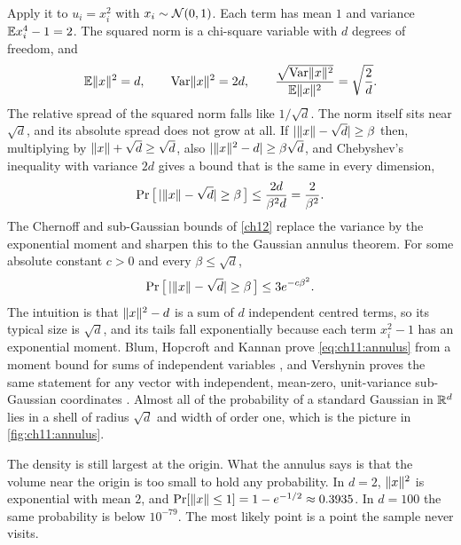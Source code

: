 Apply it to $u_i=x_i^2$ with $x_i\sim\mathcal{N}(0,1)$. Each term has mean $1$ and variance $\mathbb{E} x_i^4-1=2$. The squared norm is a chi-square variable with $d$ degrees of freedom, and
\begin{equation}\label{eq:ch11:chisq}
\mathbb{E}\lVert x\rVert^2=d,\qquad \operatorname{Var}\lVert x\rVert^2=2d,\qquad
\frac{\sqrt{\operatorname{Var}\lVert x\rVert^2}}{\mathbb{E}\lVert x\rVert^2}=\sqrt{\frac 2d}.
\end{equation}
The relative spread of the squared norm falls like $1/\sqrt d$. The norm itself sits near $\sqrt d$, and its absolute spread does not grow at all. If $\lvert \lVert x\rVert-\sqrt d\rvert\ge\beta$ then, multiplying by $\lVert x\rVert+\sqrt d\ge\sqrt d$, also $\lvert \lVert x\rVert^2-d\rvert\ge\beta\sqrt d$, and Chebyshev's inequality with variance $2d$ gives a bound that is the same in every dimension,
\begin{equation}\label{eq:ch11:annulus-cheb}
\Pr\big[\,\lvert \lVert x\rVert-\sqrt d\rvert\ge\beta\,\big]\le\frac{2d}{\beta^2 d}=\frac{2}{\beta^2}.
\end{equation}
The Chernoff and sub-Gaussian bounds of \cref{ch12} replace the variance by the exponential moment and sharpen this to the Gaussian annulus theorem. For some absolute constant $c>0$ and every $\beta\le\sqrt d$,
\begin{equation}\label{eq:ch11:annulus}
\Pr\big[\,\lvert \lVert x\rVert-\sqrt d\rvert\ge\beta\,\big]\le 3e^{-c\beta^2}.
\end{equation}
The intuition is that $\lVert x\rVert^2-d$ is a sum of $d$ independent centred terms, so its typical size is $\sqrt d$, and its tails fall exponentially because each term $x_i^2-1$ has an exponential moment. Blum, Hopcroft and Kannan prove \cref{eq:ch11:annulus} from a moment bound for sums of independent variables \cite{blum2020}, and Vershynin proves the same statement for any vector with independent, mean-zero, unit-variance sub-Gaussian coordinates \cite{vershynin2018}. Almost all of the probability of a standard Gaussian in $\mathbb{R}^d$ lies in a shell of radius $\sqrt d$ and width of order one, which is the picture in \cref{fig:ch11:annulus}.

The density is still largest at the origin. What the annulus says is that the volume near the origin is too small to hold any probability. In $d=2$, $\lVert x\rVert^2$ is exponential with mean $2$, and $\Pr[\lVert x\rVert\le1]=1-e^{-1/2}\approx0.3935$. In $d=100$ the same probability is below $10^{-79}$. The most likely point is a point the sample never visits.

